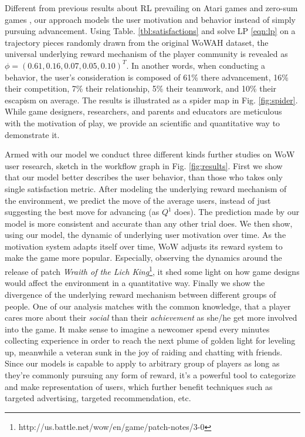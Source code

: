 \documentclass{sigchi}
\begin{document}
Different from previous results about RL prevailing on Atari games \cite{mnih2015human} and zero-sum games \cite{silver2016mastering,heinrich2016deep}, our approach models the user motivation and behavior instead of simply pursuing advancement. 
Using Table. \ref{tbl:satisfactions} and solve LP \eqref{eqn:lp} on a trajectory pieces randomly drawn from the original WoWAH dataset, the universal underlying reward mechanism of the player community is revealed as $\phi=(0.61, 0.16, 0.07, 0.05, 0.10)^T$. 
In another words, when conducting a behavior, the user's consideration is composed of 61\% there advancement, 16\% their competition, 7\% their relationship, 5\% their teamwork, and 10\% their escapism on average. 
The results is illustrated as a spider map in Fig. \ref{fig:spider}.
While game designers, researchers, and parents and educators are meticulous with the motivation of play, we provide an scientific and quantitative way to demonstrate it.

Armed with our model we conduct three different kinds further studies on WoW user research, sketch in the workflow graph in Fig. \ref{fig:results}.
First we show that our model better describes the user behavior, than those who takes only single satisfaction metric.
After modeling the underlying reward mechanism of the environment, we predict the move of the average users, instead of just suggesting the best move for advancing (as $Q^1$ does).
The prediction made by our model is more consistent and accurate than any other trial does.
We then show, using our model, the dynamic of underlying user motivation over time. 
As the motivation system adapts itself over time, WoW adjusts its reward system to make the game more popular.
Especially, observing the dynamics around the release of patch \textit{Wraith of the Lich King}\footnote{http://us.battle.net/wow/en/game/patch-notes/3-0}, it shed some light on how game designs would affect the environment in a quantitative way.
Finally we show the divergence of the underlying reward mechanism between different groups of people. 
One of our analysis matches with the common knowledge, that a player cares more about their \textit{social} than their \textit{achievement} as she/he get more involved into the game.
It make sense to imagine a newcomer spend every minutes collecting experience in order to reach the next plume of golden light for leveling up, meanwhile a veteran sunk in the joy of raiding and chatting with friends.
Since our models is capable to apply to arbitrary group of players as long as they're commonly pursuing any form of reward, it's a powerful tool to categorize and make representation of users, which further benefit techniques such as targeted advertising, targeted recommendation, etc.
\end{document}
